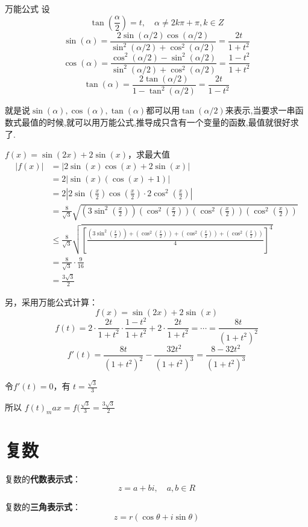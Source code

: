 \documentclass[12pt]{article}
\begin{document}
万能公式
设
$$
\tan(\frac{\alpha}{2}) = t, \quad \alpha \neq 2k\pi + \pi, k \in Z
$$
$$
\sin(\alpha) 
= \frac{2\sin(\alpha/2)\cos(\alpha/2)}{\sin^2(\alpha/2) + \cos^2(\alpha/2)} 
= \frac{2t}{1+t^2} 
$$
$$
\cos(\alpha) 
= \frac{\cos^2(\alpha/2) - \sin^2(\alpha/2)}{\sin^2(\alpha/2) + \cos^2(\alpha/2)} 
= \frac{1-t^2}{1+t^2} 
$$
$$
\tan(\alpha) = \frac{2\tan(\alpha/2)}{1 - \tan^2(\alpha/2)} = \frac{2t}{1-t^2}
$$

就是说$\sin(\alpha),\cos(\alpha),\tan(\alpha)$都可以用$\tan(\alpha/2)$来表示,当要求一串函数式最值的时候,就可以用万能公式,推导成只含有一个变量的函数,最值就很好求了.

\begin{framed}  
\small{
$f(x) = \sin(2x) + 2\sin(x)$，求最大值
\begin{align*}
|f(x)| &= |2\sin(x)\cos(x) + 2\sin(x)| \\
    &= 2|\sin(x)(\cos(x) + 1)| \\
    &= 2|2\sin(\frac{x}{2})\cos(\frac{x}{2})\cdot 2\cos^2(\frac{x}{2})| \\
    &= \frac{8}{\sqrt{3}}\sqrt{(3\sin^2(\frac{x}{2}))(\cos^2(\frac{x}{2}))(\cos^2(\frac{x}{2}))(\cos^2(\frac{x}{2}))} \\
    &\le \frac{8}{\sqrt{3}}\sqrt{[\frac{(3\sin^2(\frac{x}{2})) + (\cos^2(\frac{x}{2})) + (\cos^2(\frac{x}{2})) + (\cos^2(\frac{x}{2}))}{4}]^4} \\
    &= \frac{8}{\sqrt{3}}\cdot \frac{9}{16} \\
    &= \frac{3\sqrt{3}}{2} 
\end{align*}

另，采用万能公式计算：
$$
f(x) = \sin(2x) + 2\sin(x)
$$
$$
f(t) = 2\cdot\frac{2t}{1+t^2}\cdot\frac{1-t^2}{1+t^2} + 2\cdot\frac{2t}{1+t^2} = \cdots = \frac{8t}{(1+t^2)^2}
$$
$$
f'(t) = \frac{8t}{(1+t^2)^2} - \frac{32t^2}{(1+t^2)^3} = \frac{8-32t^2}{(1+t^2)^3}
$$

令$f'(t) = 0$，有 $t = \frac{\sqrt{3}}{3}$

所以 $f(t)_max = f(\frac{\sqrt{3}}{3} = \frac{3\sqrt{3}}{2}$
}
\end{framed}

\section{复数}
复数的\textbf{代数表示式}：
$$
z = a + bi, \quad a,b \in R
$$

复数的\textbf{三角表示式}：
$$
z = r(\cos\theta + i\sin\theta)
$$
\end{document}
